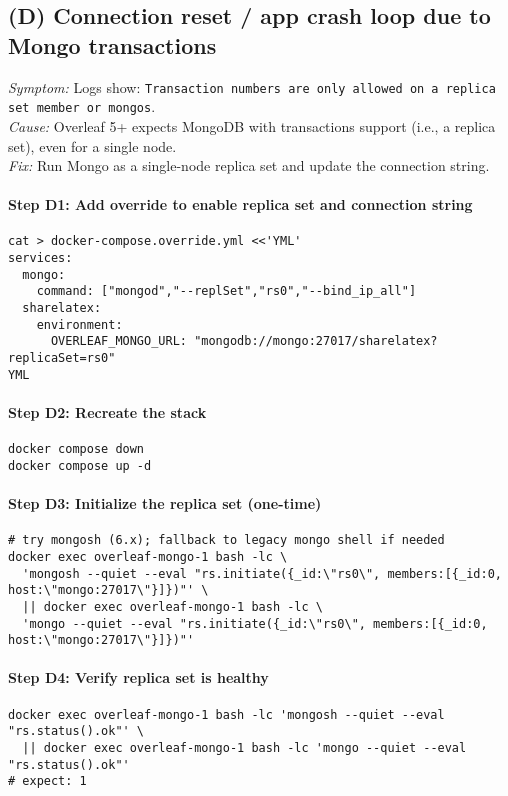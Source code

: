 \subsection{(D) Connection reset / app crash loop due to Mongo transactions}
\textit{Symptom:} Logs show: \texttt{Transaction numbers are only allowed on a replica set member or mongos}.\\
\textit{Cause:} Overleaf 5+ expects MongoDB with transactions support (i.e., a replica set), even for a single node.\\
\textit{Fix:} Run Mongo as a single-node replica set and update the connection string.

\paragraph{Step D1: Add override to enable replica set and connection string}
\begin{verbatim}
cat > docker-compose.override.yml <<'YML'
services:
  mongo:
    command: ["mongod","--replSet","rs0","--bind_ip_all"]
  sharelatex:
    environment:
      OVERLEAF_MONGO_URL: "mongodb://mongo:27017/sharelatex?replicaSet=rs0"
YML
\end{verbatim}

\paragraph{Step D2: Recreate the stack}
\begin{verbatim}
docker compose down
docker compose up -d
\end{verbatim}

\paragraph{Step D3: Initialize the replica set (one-time)}
\begin{verbatim}
# try mongosh (6.x); fallback to legacy mongo shell if needed
docker exec overleaf-mongo-1 bash -lc \
  'mongosh --quiet --eval "rs.initiate({_id:\"rs0\", members:[{_id:0, host:\"mongo:27017\"}]})"' \
  || docker exec overleaf-mongo-1 bash -lc \
  'mongo --quiet --eval "rs.initiate({_id:\"rs0\", members:[{_id:0, host:\"mongo:27017\"}]})"'
\end{verbatim}

\paragraph{Step D4: Verify replica set is healthy}
\begin{verbatim}
docker exec overleaf-mongo-1 bash -lc 'mongosh --quiet --eval "rs.status().ok"' \
  || docker exec overleaf-mongo-1 bash -lc 'mongo --quiet --eval "rs.status().ok"'
# expect: 1
\end{verbatim}

